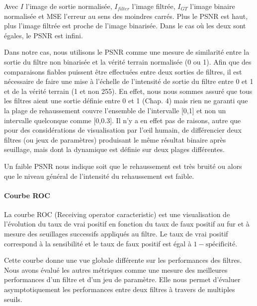 Avec $I$ l'image de sortie normalisée, $I_{filter}$ l'image filtrée, $I_{GT}$ l'image binaire normalisée et MSE l'erreur au sens des moindres carrés. Plus le PSNR est haut, plus l'image filtrée est proche de l'image binarisée. Dans le cas où les deux sont égales, le PSNR est infini.

Dans notre cas, nous utilisons le PSNR comme une mesure de similarité entre la sortie du filtre non binarisée et la vérité terrain normalisée (0 ou 1). Afin que des comparaisons fiables puissent être effectuées entre deux sorties de filtres, il est nécessaire de faire une mise à l'échelle de l'intensité de sortie du filtre entre 0 et 1 et de la vérité terrain (1 et non 255). En effet, nous nous sommes assuré que tous les filtres aient une sortie définie entre 0 et 1 (Chap. 4) mais rien ne garanti que la plage de rehaussement couvre l'ensemble de l'intervalle [0,1] et non un intervalle quelconque comme [0,0.3]. Il n'y a en effet pas de raisons, autre que pour des considérations de visualisation par l'œil humain, de différencier deux filtres (ou jeux de paramètres) produisant le même résultat binaire après seuillage, mais dont la dynamique est définie sur deux plages différentes.

Un faible PSNR nous indique soit que le rehaussement est très bruité ou alors que le niveau général de l'intensité du rehaussement est faible.


\paragraph{Courbe ROC}

La courbe ROC (Receiving operator caracteristic) est une visualisation de l'évolution du taux de vrai positif en fonction du taux de faux positif au fur et à mesure des seuillages successifs appliqués au filtre. Le taux de vrai positif correspond à la sensibilité et le taux de faux positif est égal à $1-\text{spécificité}$. 

Cette courbe donne une vue globale différente sur les performances des filtres. Nous avons évalué les autres métriques comme une mesure des meilleures performances d'un filtre et d'un jeu de paramètre. Elle nous permet d'évaluer asymptotiquement les performances entre deux filtres à travers de multiples seuils.


